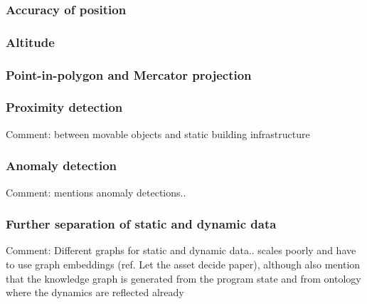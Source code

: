 \documentclass{article}
\begin{document}
\subsubsection{Accuracy of position}
\subsubsection{Altitude}
\subsubsection{Point-in-polygon and Mercator projection}
\subsubsection{Proximity detection}
Comment: between movable objects and static building infrastructure
\subsubsection{Anomaly detection}
Comment: \cite{li_digital_2022} mentions anomaly detections..
\subsubsection{Further separation of static and dynamic data}
Comment: Different graphs for static and dynamic data.. scales poorly and have to use graph embeddings (ref. Let the asset decide paper), although also mention that the knowledge graph is generated from the program state and from ontology where the dynamics are reflected already



\newpage
\printbibliography
\end{document}
